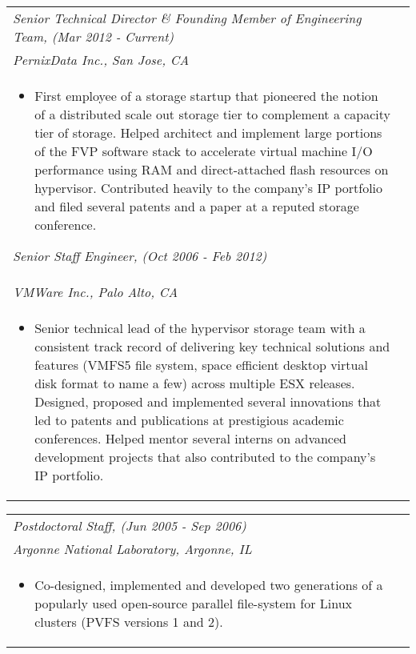 \documentclass{article}
\begin{document}
  \begin{center}
         \normalsize
	\begin{tabularx}{6.2in}{Xr}
           \emph{Senior Technical Director \& Founding Member of Engineering Team, (Mar 2012 - Current) } \\
	\emph{PernixData Inc., San Jose, CA} & \\
	\begin{itemize}
	\small
     \item {First employee of a storage startup that pioneered the notion of a
           distributed scale out storage tier to complement a capacity tier of
           storage. Helped architect and implement
           large portions of the FVP software stack to accelerate virtual
           machine I/O performance using RAM and direct-attached flash
        resources on hypervisor. Contributed heavily to the company's IP
     portfolio and filed several patents and a paper at a reputed storage
  conference.}
	\end{itemize}
	\normalsize

        \emph{Senior Staff Engineer, (Oct 2006 - Feb 2012) } \\
	\emph{VMWare Inc., Palo Alto, CA} & \\
	\begin{itemize}
	\small
     \item {Senior technical lead of the hypervisor storage team with a consistent
           track record of delivering key technical solutions and features
           (VMFS5 file system, space efficient desktop virtual disk format to name a few)
           across multiple ESX releases. Designed, proposed and implemented several
           innovations that led to patents and publications at prestigious
           academic conferences. Helped mentor several interns on advanced
           development projects that also contributed to the company's IP
        portfolio.}
	\end{itemize}
	\end{tabularx}

	\normalsize
	\begin{tabularx}{6.2in}{Xr}
           \emph{Postdoctoral Staff, (Jun 2005 - Sep 2006) } \\
	\emph{Argonne National Laboratory, Argonne, IL}  \\
	\begin{itemize}
	\small
        \item {Co-designed, implemented and developed two generations of a popularly used open-source parallel file-system
           for Linux clusters (PVFS versions 1 and 2).}
	\end{itemize}
	\end{tabularx}

  \end{center}
\end{document}
